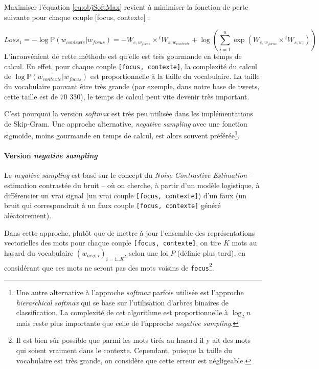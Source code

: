 \documentclass[11pt,french,french]{article}
\let\rmarkdownfootnote\footnote%
\def\footnote{\protect\rmarkdownfootnote}
\begin{document}
Maximiser l'équation \eqref{eq:objSoftMax} revient à minimiser la fonction
de perte suivante pour chaque couple {[}focus, contexte{]} :

\[
Loss_{1}=-\log\mathbb P(w_{contexte}\vert w_{focus}) =
-W_{e,w_{focus}}\times {}^tW_{s,w_{contexte}}+
\log\left(\sum_{i=1}^n\exp(W_{e,w_{focus}}\times {}^t W_{s,w_i})\right)
\] L'inconvénient de cette méthode est qu'elle est très gourmande en
temps de calcul. En effet, pour chaque couple
\texttt{{[}focus,\ contexte{]}}, la complexité du calcul de
\(\log\mathbb P(w_{contexte}\vert w_{focus})\) est proportionnelle à la
taille du vocabulaire. La taille du vocabulaire pouvant être très grande
(par exemple, dans notre base de tweets, cette taille est de 70 330), le
temps de calcul peut vite devenir très important.

C'est pourquoi la version \emph{softmax} est très peu utilisée dans les
implémentations de Skip-Gram. Une approche alternative, \emph{negative
sampling} avec une fonction sigmoïde, moins gourmande en temps de
calcul, est alors souvent préférée\footnote{Une autre alternative à
  l'approche \emph{softmax} parfois utilisée est l'approche
  \emph{hierarchical softmax} qui se base sur l'utilisation d'arbres
  binaires de classification. La complexité de cet algorithme est
  proportionnelle à \(\log_2n\) mais reste plus importante que celle de
  l'approche \emph{negative sampling}.}.

\paragraph{\texorpdfstring{Version \emph{negative
sampling}}{Version negative sampling}}\label{subsec:negsampling}

Le \emph{negative sampling} est basé sur le concept du \emph{Noise
Contrastive Estimation} -- estimation contrastée du bruit -- où on
cherche, à partir d'un modèle logistique, à différencier un vrai signal
(un vrai couple \texttt{{[}focus,\ contexte{]}}) d'un faux (un bruit qui
correspondrait à un faux couple \texttt{{[}focus,\ contexte{]}} généré
aléatoirement).

Dans cette approche, plutôt que de mettre à jour l'ensemble des
représentations vectorielles des mots pour chaque couple
\texttt{{[}focus,\ contexte{]}}, on tire \(K\) mots au hasard du
vocabulaire \((w_{neg,\,i})_{i=1..K}\), selon une loi \(P\) (définie
plus tard), en considérant que ces mots ne seront pas des mots voisins
de \texttt{focus}\footnote{Il est bien sûr possible que parmi les mots
  tirés au hasard il y ait des mots qui soient vraiment dans le
  contexte. Cependant, puisque la taille du vocabulaire est très grande,
  on considère que cette erreur est négligeable.}.
\end{document}

